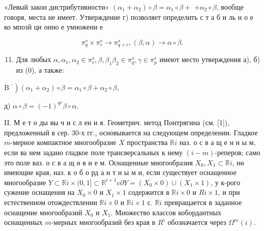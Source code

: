 \documentclass[10pt]{article}
\begin{document}
«Левый закон дистрибутивности» $\left(\alpha_{1}+\alpha_{2}\right) \circ \beta=\alpha_{1} \circ \beta+$ $+\alpha_{2} \circ \beta$, вообще говоря, места не имеет. Утверждение г) позволяет определить с т а б и ль н о е ко мпозй ци онно е умножени е



\[

\pi_{q}^{s} \times \pi_{r}^{s} \rightarrow \pi_{q+r}^{s},(\beta, \alpha) \longrightarrow \alpha \circ \beta .

\]



\begin{enumerate}

  \setcounter{enumi}{10}

  \item Для любых $\alpha, \alpha_{1}, \alpha_{2} \in \pi_{r}^{s}, \beta, \beta_{1} \beta_{2} \in \pi_{q}^{s}, \gamma \in \pi_{p}^{s}$ имеют место утверждения а), б) из (0), а также:

\end{enumerate}



B $\left.^{\prime}\right)\left(\alpha_{1}+\alpha_{2}\right) \circ \beta=\alpha_{1} \circ \beta+\alpha_{2} \circ \beta$,



д) $\alpha \circ \beta=(-1)^{q r} \beta \circ \alpha$.



II. М е т о ды вы ч и с л ен и я. Геометрич. метод Понтрягина (см. [1]), предложенный в сер. 30-х гг., основывается на следующем определении. Гладкое $m$-мерное компактное многообразие $X$ пространства $\mathbb{R} i$ наз. о с в а щ е н н ы м, если ва нем задано гладкое поле трансверсальных к нему $(i-m)$-реперов; само это поле ваз. о с в а щ ө в и е м. Оснащенные многообразия $X_{0}, X_{1} \subset \mathbb{R} i$, нө имеющие края, наз. к о б о рд а н т н ы м и, если существует оснащенное многообразие $Y \subset \mathbb{R} i \times(0,1] \subset \mathbb{R}^{i+1} \mathrm{c} \partial Y=\left(X_{0} \times 0\right) \cup\left(X_{1} \times 1\right)$, у к-рого сужение оснащения на $X_{0} \times 0$ и $X_{1} \times 1$ содержится в $\mathbb{R} i \times 0$ и $R i \times 1$, и при естественном отождествлении $\mathbb{R} i \times 0$ и $\mathbb{R} i \times 1$ с. $\mathbb{R} i$ превращается в заданное оснащение многообразий $X_{0}$ и $X_{1}$. Множество классов кобордантных оснащенных $m$-мерных многообразий без края в $R^{i}$ обозначается через $\Omega^{m}(i)$.
\end{document}
